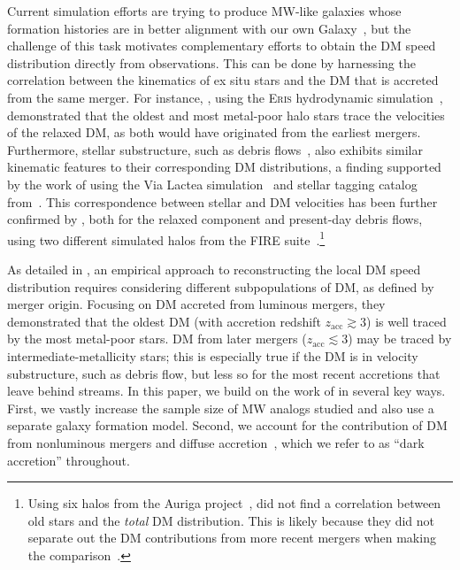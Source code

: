 \documentclass[twocolumn,tighten,twocolappendix]{aastex701}
\newcommand{\zacc}[1]{\ensuremath{z_\mathrm{acc}}}
\begin{document}
Current simulation efforts are trying to produce MW-like galaxies whose formation histories are in better alignment with our own Galaxy~\citep[e.g.,][]{2022MNRAS.512.5823M, 2023MNRAS.521..995R, 2024ApJ...971...79B}, but the challenge of this task motivates complementary efforts to obtain the DM speed distribution directly from observations.  This can be done by harnessing the correlation between the kinematics of ex situ stars and the DM that is accreted from the same merger. For instance, \citet{2018PhRvL.120d1102H}, using the \textsc{Eris} hydrodynamic simulation~\citep{2011ApJ...742...76G}, demonstrated that the oldest and most metal-poor halo stars trace the velocities of the relaxed DM, as both would have originated from the earliest mergers. Furthermore, stellar substructure, such as debris flows~\citep{2012PDU.....1..155L}, also exhibits similar kinematic features to their corresponding DM distributions, a finding supported by the work of \citet{2015ApJ...807...14L} using the Via Lactea simulation~\citep{2008Natur.454..735D} and stellar tagging catalog from~\cite{2012ApJ...745..142R}. This correspondence between stellar and DM velocities has been further confirmed by \citet{2019ApJ...883...27N}, both for the relaxed component and present-day debris flows, using two different simulated halos from the FIRE suite~\citep{2018MNRAS.480..800H}.\footnote{Using six halos from the Auriga project~\citep{2017MNRAS.467..179G}, \citet{2019JCAP...06..045B} did not find a correlation between old stars and the \emph{total} DM distribution. This is likely because they did not separate out the DM contributions from more recent mergers when making the comparison~\citep{2018arXiv181204114L}.} 

As detailed in \citet{2019ApJ...883...27N}, an empirical approach to reconstructing the local DM speed distribution requires considering different subpopulations of DM, as defined by merger origin.  Focusing on DM accreted from luminous mergers, they demonstrated that the oldest DM (with accretion redshift $\zacc{} \gtrsim 3$) is well traced by the most metal-poor stars.  DM from later  mergers ($\zacc{} \lesssim 3$) may be traced by intermediate-metallicity stars; this is especially true if the DM is in velocity substructure, such as debris flow, but less so for the most recent accretions that leave behind  streams. In this paper, we build  on the work of \citet{2019ApJ...883...27N} in several key ways.  First, we vastly increase the sample size of MW analogs studied and also use a separate galaxy formation model.  Second, we account for the contribution of DM from nonluminous mergers and diffuse accretion~\citep{2011MNRAS.413.1373W, 2015MNRAS.448.2941S, 2010MNRAS.401.1796A}, which we refer to as ``dark accretion'' throughout.
\end{document}
